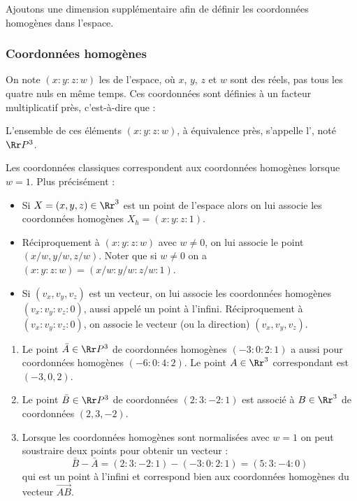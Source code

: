 \documentclass[11pt,class=report,crop=false]{standalone}
\begin{document}
Ajoutons une dimension supplémentaire afin de définir les coordonnées homogènes dans l'espace.

\subsubsection*{Coordonnées homogènes}

On note $(x:y:z:w)$ les  de l'espace, où $x$, $y$, $z$ et $w$ sont des réels, pas tous les quatre nuls en même temps.
Ces coordonnées sont définies à un facteur multiplicatif près, c'est-à-dire que :

L'ensemble de ces éléments $(x:y:z:w)$, à équivalence près, s'appelle l', noté $\Rr P^3$.


Les coordonnées classiques correspondent aux coordonnées homogènes lorsque $w=1$. Plus précisément :
\begin{itemize}
	\item Si $X = (x,y,z) \in \Rr^3$ est un point de l'espace alors on lui associe les coordonnées homogènes $X_h = (x:y:z:1)$.
	
	\item Réciproquement à $(x:y:z:w)$ avec $w\neq 0$, on lui associe le point $(x/w,y/w,z/w)$. Noter que si $w\neq 0$ on a $(x:y:z:w) = (x/w:y/w:z/w:1)$.
	
	\item Si $(v_x,v_y,v_z)$ est un vecteur, on lui associe les coordonnées homogènes $(v_x:v_y:v_z:0)$, aussi appelé \og{}un point à l'infini\fg{}.
	Réciproquement à $(v_x:v_y:v_z:0)$, on associe le vecteur (ou la direction) $(v_x,v_y,v_z)$.
\end{itemize}

\begin{exemple}
	\sauteligne
\begin{enumerate}
	\item Le point $\bar A \in \Rr P^3$ de coordonnées homogènes $(-3:0:2:1)$ a aussi pour coordonnées homogènes $(-6:0:4:2)$.
	Le point $A \in \Rr^3$ correspondant est $(-3,0,2)$.
	
	\item Le point $\bar B \in \Rr P^3$ de coordonnées $(2:3:-2:1)$ est associé à $B \in \Rr^3$ de coordonnées $(2,3,-2)$.
	
	\item Lorsque les coordonnées homogènes sont normalisées avec $w=1$ on peut soustraire deux points pour obtenir un vecteur :
	$$\bar B - \bar A =(2:3:-2:1) - (-3:0:2:1) = (5:3:-4:0)$$
	qui est un point à l'infini et correspond bien aux coordonnées homogènes du vecteur $\vec{AB}$.
	
\end{enumerate}	
\end{exemple}
\end{document}

